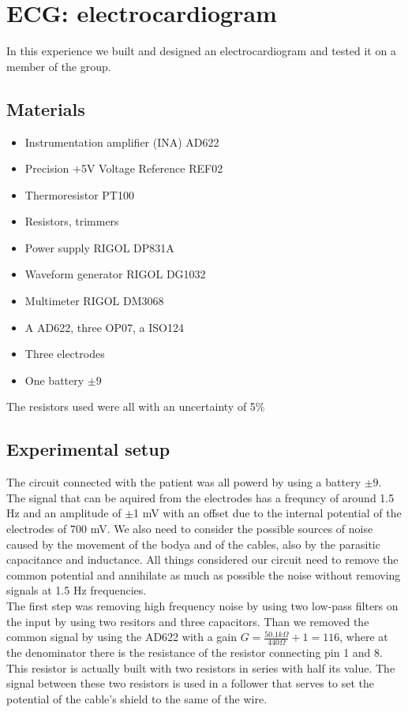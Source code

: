 \chapter{ECG: electrocardiogram}
In this experience we built and designed an electrocardiogram and tested it on a member of the group.

\section{Materials}
\begin{itemize}
\item Instrumentation amplifier (INA) AD622
\item Precision +5V Voltage Reference REF02
\item Thermoresistor PT100
\item Resistors, trimmers
\item Power supply RIGOL DP831A
\item Waveform generator RIGOL DG1032
\item Multimeter RIGOL DM3068
\item A AD622, three OP07, a ISO124
\item Three electrodes
\item One battery $\pm 9$
\end{itemize}
The resistors used were all with an uncertainty of 5\%
\section{Experimental setup}
The circuit connected with the patient was all powerd by using a battery $\pm 9$.
The signal that can be aquired from the electrodes has a frequncy of around 1.5 Hz and an amplitude of $\pm$1 mV with an offset due to the internal potential of the electrodes of 700 mV. We also need to consider the possible sources of noise caused by the movement of the bodya and of the cables, also by the parasitic capacitance and inductance. All things considered our circuit need to remove the common potential and    annihilate as much as possible the noise without removing signals at 1.5 Hz frequencies. \\

The  first step was removing high frequency noise by using two low-pass filters on the input by using two resitors and three capacitors.
Than we removed the common signal by using the AD622 with a gain $G =   \frac{50.1 k\Omega}{440 \Omega} + 1 = 116$, where at the denominator there is the resistance of the resistor connecting pin 1 and 8. This resistor is actually built with two resistors in series with half its value. The signal between these two resistors is used in a follower that serves to set the potential of the cable's shield to the same of the wire.\\


